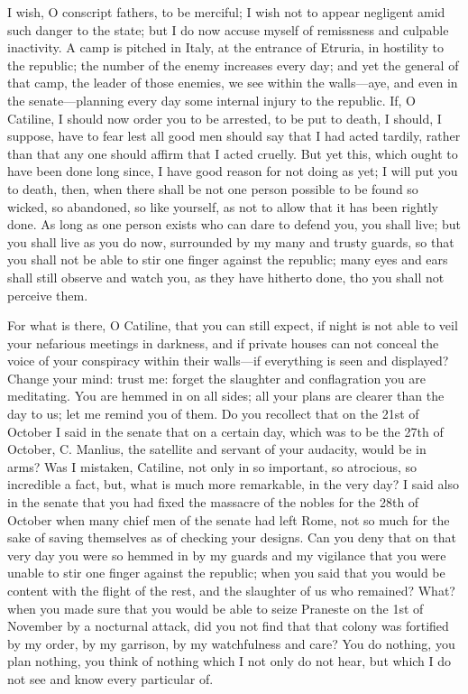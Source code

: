 \documentclass[a4paper]{amsbook}
\begin{document}
I wish, O conscript fathers, to be merciful; I wish not to appear negligent amid such danger to the state; but I do now accuse myself of remissness and culpable inactivity. A camp is pitched in Italy, at the entrance of Etruria, in hostility to the republic; the number of the enemy increases every day; and yet the general of that camp, the leader of those enemies, we see within the walls—aye, and even in the senate—planning every day some internal injury to the republic. If, O Catiline, I should now order you to be arrested, to be put to death, I should, I suppose, have to fear lest all good men should say that I had acted tardily, rather than that any one should affirm that I acted cruelly. But yet this, which ought to have been done long since, I have good reason for not doing as yet; I will put you to death, then, when there shall be not one person possible to be found so wicked, so abandoned, so like yourself, as not to allow that it has been rightly done. As long as one person exists who can dare to defend you, you shall live; but you shall live as you do now, surrounded by my many and trusty guards, so that you shall not be able to stir one finger against the republic; many eyes and ears shall still observe and watch you, as they have hitherto done, tho you shall not perceive them.

For what is there, O Catiline, that you can still expect, if night is not able to veil your nefarious meetings in darkness, and if private houses can not conceal the voice of your conspiracy within their walls—if everything is seen and displayed? Change your mind: trust me: forget the slaughter and conflagration you are meditating. You are hemmed in on all sides; all your plans are clearer than the day to us; let me remind you of them. Do you recollect that on the 21st of October I said in the senate that on a certain day, which was to be the 27th of October, C. Manlius, the satellite and servant of your audacity, would be in arms? Was I mistaken, Catiline, not only in so important, so atrocious, so incredible a fact, but, what is much more remarkable, in the very day? I said also in the senate that you had fixed the massacre of the nobles for the 28th of October when many chief men of the senate had left Rome, not so much for the sake of saving themselves as of checking your designs. Can you deny that on that very day you were so hemmed in by my guards and my vigilance that you were unable to stir one finger against the republic; when you said that you would be content with the flight of the rest, and the slaughter of us who remained? What? when you made sure that you would be able to seize Praneste on the 1st of November by a nocturnal attack, did you not find that that colony was fortified by my order, by my garrison, by my watchfulness and care? You do nothing, you plan nothing, you think of nothing which I not only do not hear, but which I do not see and know every particular of.
\end{document}
